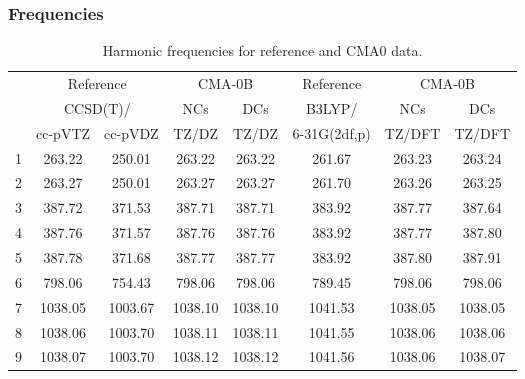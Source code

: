 \documentclass[10pt,oneside]{article}
\begin{document}
\subsubsection*{Frequencies}
\begin{table}[h!]
\centering
\caption{Harmonic frequencies for reference and CMA0 data.}
\begin{tabular}{cccccccc}
\toprule
{} & \multicolumn{2}{c}{Reference} & \multicolumn{2}{c}{CMA-0B} &    Reference & \multicolumn{2}{c}{CMA-0B} \\
{} & \multicolumn{2}{c}{CCSD(T)/} &     NCs &     DCs &       B3LYP/ &     NCs &     DCs \\
{} &   cc-pVTZ & cc-pVDZ &   TZ/DZ &   TZ/DZ & 6-31G(2df,p) &  TZ/DFT &  TZ/DFT \\
\midrule
1 &    263.22 &  250.01 &  263.22 &  263.22 &       261.67 &  263.23 &  263.24 \\
2 &    263.27 &  250.01 &  263.27 &  263.27 &       261.70 &  263.26 &  263.25 \\
3 &    387.72 &  371.53 &  387.71 &  387.71 &       383.92 &  387.77 &  387.64 \\
4 &    387.76 &  371.57 &  387.76 &  387.76 &       383.92 &  387.77 &  387.80 \\
5 &    387.78 &  371.68 &  387.77 &  387.77 &       383.92 &  387.80 &  387.91 \\
6 &    798.06 &  754.43 &  798.06 &  798.06 &       789.45 &  798.06 &  798.06 \\
7 &   1038.05 & 1003.67 & 1038.10 & 1038.10 &      1041.53 & 1038.05 & 1038.05 \\
8 &   1038.06 & 1003.70 & 1038.11 & 1038.11 &      1041.55 & 1038.06 & 1038.06 \\
9 &   1038.07 & 1003.70 & 1038.12 & 1038.12 &      1041.56 & 1038.06 & 1038.07 \\
\bottomrule
\end{tabular}
\end{table}

\clearpage
\end{document}
